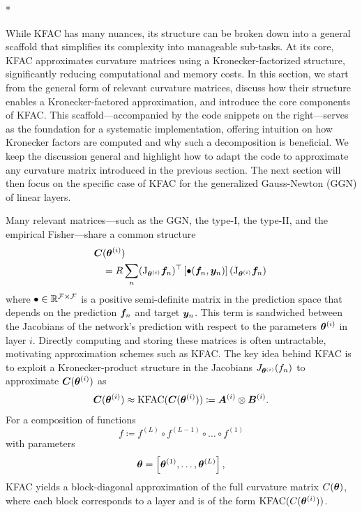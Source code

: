 \switchcolumn[1]*
\switchcolumn[0]

While KFAC has many nuances, its structure can be broken down into a general scaffold that simplifies its complexity into manageable sub-tasks.
At its core, KFAC approximates curvature matrices using a Kronecker-factorized structure, significantly reducing computational and memory costs.
In this section, we start from the general form of relevant curvature matrices, discuss how their structure enables a Kronecker-factored approximation, and introduce the core components of KFAC.
This scaffold---accompanied by the code snippets on the right---serves as the foundation for a systematic implementation, offering intuition on how Kronecker factors are computed and why such a decomposition is beneficial.
We keep the discussion general and highlight how to adapt the code to approximate any curvature matrix introduced in the previous section.
The next section will then focus on the specific case of KFAC for the generalized Gauss-Newton (GGN) of linear layers.

Many relevant matrices---such as the GGN, the type-I, the type-II, and the empirical Fisher---share a common structure
\begin{align*}
  {\bm{C}}&({\bm{\theta}}^{(i)}) \\
  &= R \sum_n
  (\mathrm{J}_{{\bm{\theta}}^{(i)}} {\bm{f}}_n)^{\top}
  \left[ \bullet({\bm{f}}_n, {\bm{y}}_n) \right]
  (\mathrm{J}_{{\bm{\theta}}^{(i)}} {\bm{f}}_n)\,
\end{align*}
where $\bullet \in {\mathbb{R}}^{{\mathcal{F}} \times {\mathcal{F}}}$ is a positive semi-definite matrix in the prediction space that depends on the prediction ${\bm{f}}_n$ and target ${\bm{y}}_n$.
This term is sandwiched between the Jacobians of the network's prediction with respect to the parameters ${\bm{\theta}}^{(i)}$ in layer $i$.
Directly computing and storing these matrices is often untractable, motivating approximation schemes such as KFAC.
The key idea behind KFAC is to exploit a Kronecker-product structure in the Jacobians $J_{{\bm{\theta}}^{(i)}}(f_n)$ to approximate ${\bm{C}}({\bm{\theta}}^{(i)})$ as
\begin{align*}
  {\bm{C}}({\bm{\theta}}^{(i)})
  \approx
  \mathrm{KFAC}({\bm{C}}({\bm{\theta}}^{(i)}))
  \coloneqq {\bm{A}}^{(i)} \otimes {\bm{B}}^{(i)}.
\end{align*}
For a composition of functions $$f \coloneqq f^{(L)} \circ f^{(L-1)} \circ \dots \circ f^{(1)}$$ with parameters $${\bm{\theta}} = \left[ {\bm{\theta}}^{(1)}, \dots, {\bm{\theta}}^{(L)} \right],$$ KFAC yields a block-diagonal approximation of the full curvature matrix $C({\bm{\theta}})$, where each block corresponds to a layer and is of the form $\mathrm{KFAC}(C({\bm{\theta}}^{(i)}))$.

